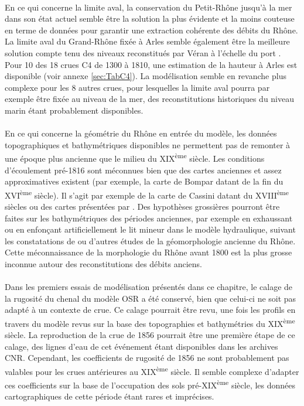 	\paragraph{} En ce qui concerne la limite aval, la conservation du Petit-Rhône jusqu'à la mer dans son état actuel semble être la solution la plus évidente et la moins couteuse en terme de données pour garantir une extraction cohérente des débits du Rhône. La limite aval du Grand-Rhône fixée à Arles semble également être la meilleure solution compte tenu des niveaux reconstitués par Véran à l'échelle du port \citep{pichard_les_1995}. Pour 10 des 18 crues C4 de 1300 à 1810, une estimation de la hauteur à Arles est disponible (voir annexe \ref{sec:TabC4}). La modélisation semble en revanche plus complexe pour les 8 autres crues, pour lesquelles la limite aval pourra par exemple être fixée au niveau de la mer, des reconstitutions historiques du niveau marin étant probablement disponibles.
	
	\paragraph{} En ce qui concerne la géométrie du Rhône en entrée du modèle, les données topographiques et bathymétriques disponibles ne permettent pas de remonter à une époque plus ancienne que le milieu du XIX\textsuperscript{ème} siècle. Les conditions d'écoulement pré-1816 sont méconnues bien que des cartes anciennes et assez approximatives existent (par exemple, la carte de Bompar datant de la fin du XVI\textsuperscript{ème} siècle). Il s'agit par exemple de la carte de Cassini datant du XVIII\textsuperscript{ème} siècles ou des cartes présentées par \citet{pichard_sept_2014}. Des hypothèses grossières pourront être faites sur les bathymétriques des périodes anciennes, par exemple en exhaussant ou en enfonçant artificiellement le lit mineur dans le modèle hydraulique, suivant les constatations de \citet{pichard_sept_2014} ou d'autres études de la géomorphologie ancienne du Rhône. Cette méconnaissance de la morphologie du Rhône avant 1800 est la plus grosse inconnue autour des reconstitutions des débits anciens.
	
	\paragraph{} Dans les premiers essais de modélisation présentés dans ce chapitre, le calage de la rugosité du chenal du modèle OSR a été conservé, bien que celui-ci ne soit pas adapté à un contexte de crue. Ce calage pourrait être revu, une fois les profils en travers du modèle revus sur la base des topographies et bathymétries du XIX\textsuperscript{ème} siècle. La reproduction de la crue de 1856 pourrait être une première étape de ce calage, des lignes d'eau de cet événement étant disponibles dans les archives CNR. Cependant, les coefficients de rugosité de 1856 ne sont probablement pas valables pour les crues antérieures au XIX\textsuperscript{ème} siècle. Il semble complexe d'adapter ces coefficients sur la base de l'occupation des sols pré-XIX\textsuperscript{ème} siècle, les données cartographiques de cette période étant rares et imprécises. 
	
